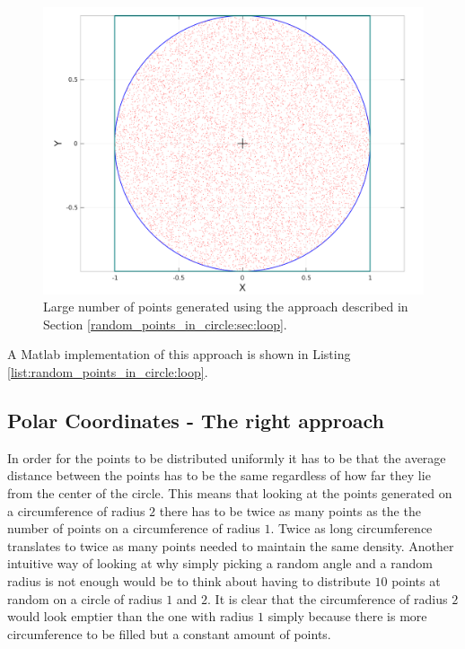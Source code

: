 \begin{figure}
	\label{fig:random_points_in_cirle:loop}
	\centering
	\includegraphics[scale=0.3]{sources/random_points_in_circle/images/loop_points}
	\caption{Large number of points generated using the approach described in Section \ref{random_points_in_circle:sec:loop}.}
\end{figure}

A Matlab implementation of this approach is shown in Listing \ref{list:random_points_in_circle:loop}.



\subsection{Polar Coordinates - The right approach}
\label{random_points_in_circle:sec:polar_sqrt}


In order for the points to be distributed uniformly it has to be that the average distance between the points has to be the same regardless of how far they lie from the center of the circle. This means that looking at the points generated on a circumference of radius $2$ there has to be twice as many points as the the number of points on a circumference of radius $1$. Twice as long circumference translates to twice as many points needed to maintain the same density. 
Another intuitive way  of looking at why simply picking a random angle and a random radius is not enough would be to think about having to distribute $10$ points at random on a circle of radius $1$ and $2$. It is clear that the circumference of radius $2$ would look emptier than the one with radius $1$ simply because there is more circumference to be filled but a constant amount of points. 


